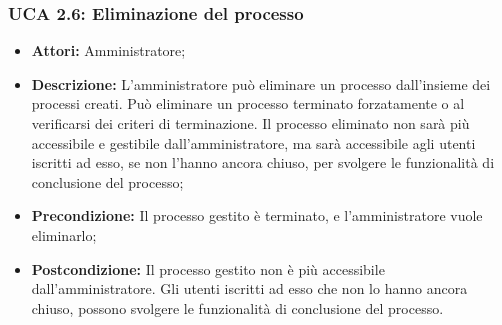 \subsubsection{UCA 2.6: Eliminazione del processo}
\begin{itemize}
\item \textbf{Attori:} Amministratore;
\item \textbf{Descrizione:} 
L'amministratore può eliminare un processo dall'insieme dei processi creati.
Può eliminare un processo terminato forzatamente o al verificarsi dei criteri di terminazione.
Il processo eliminato non sarà più accessibile e gestibile dall'amministratore, ma sarà accessibile agli utenti iscritti ad esso, se non l'hanno ancora chiuso, per svolgere le funzionalità di conclusione del processo;
\item \textbf{Precondizione:} 
Il processo gestito è terminato, e l'amministratore vuole eliminarlo;
\item \textbf{Postcondizione:} 
Il processo gestito non è più accessibile dall'amministratore. Gli utenti iscritti ad esso che non lo hanno ancora chiuso, possono svolgere le funzionalità di conclusione del processo.
\end{itemize}